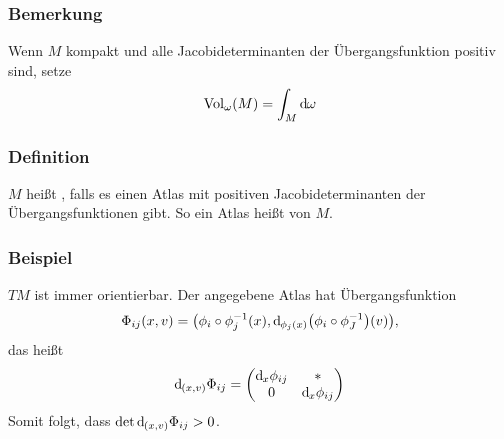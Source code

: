 \subsubsection[Bemerkung: Volumen von kompakten Mannigfaltigkeiten]{Bemerkung}
\label{ssub:1100}
Wenn $M$ kompakt und alle Jacobideterminanten der Übergangsfunktion positiv sind, setze 
\[
\operatorname{Vol}_\omega (M) = \int_M \mathrm{d}\mkern-1.0mu \omega
\]

\subsubsection{Definition}
\label{ssub:1101}
$M$ heißt , falls es einen Atlas mit positiven Jacobideterminanten der Übergangsfunktionen gibt. So ein Atlas heißt  von $M$.

\subsubsection{Beispiel}
\label{ssub:1102}
$TM$ ist immer orientierbar. Der angegebene Atlas hat Übergangsfunktion 
\[
\Phi_{ij} (x,v) = \enbrace*{\phi_i \circ \phi_j^{-1} (x), \mathd _{\phi_j(x)}\enbrace*{\phi_i \circ \phi_J^{-1}}(v)},
\]
das heißt
\[
\mathrm{d}\mkern-1.0mu_{(x,v)} \Phi_{ij} = \begin{pmatrix}
\mathrm{d}\mkern-1.0mu_x \phi_{ij} & *\\
0 & \mathrm{d}\mkern-1.0mu_x \phi_{ij}
\end{pmatrix}
\]
Somit folgt, dass $\det \mathrm{d}\mkern-1.0mu_{(x,v)} \Phi_{ij} > 0$.

